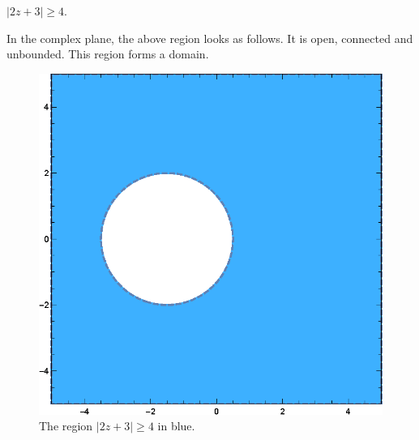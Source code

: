 \documentclass[12pt]{book}
\begin{document}
\begin{exmp}
    $|2z + 3| \geq 4.$
\end{exmp}
In the complex plane, the above region looks as follows. It is open, connected and unbounded. This region forms a domain.
\begin{figure}[H]
    \centering
    \includegraphics[scale = 0.7]{./figs/chapter_1/region_plot_2.eps}
    \caption{The region $|2z + 3| \geq 4$ in blue.}
\end{figure}
\end{document}
